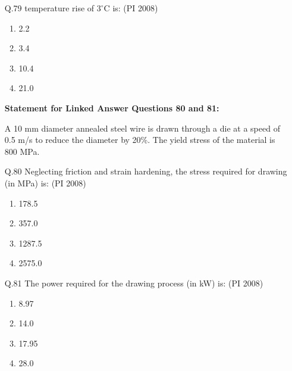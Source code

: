 \documentclass[journal,12pt,onecolumn]{IEEEtran}
\theoremstyle{remark}
\begin{document}
\begin{enumerate}
\textbf{Q.78} The torque (in N·m) applied by the brake on the rotating part is:\hfill{(PI 2008)} 
\begin{multicols}{4}
    \begin{enumerate}[label=(\Alph*)]
\item  215  
\item 315 
\item 630 
\item 1260

 \end{enumerate}
\end{multicols}
\vspace{1cm}


\item[\textnormal{Q.79}] temperature rise of $3^\circ$C is:
\hfill{(PI 2008)}
\begin{multicols}{4}
    \begin{enumerate}[label=(\Alph*)]
\item  2.2 
\item 3.4  
\item 10.4  
\item 21.0

 \end{enumerate}
\end{multicols}
\vspace{1cm}

\textbf{Statement for Linked Answer Questions 80 and 81:}

A 10 mm diameter annealed steel wire is drawn through a die at a speed of 0.5 m/s to reduce the diameter by 20\%.  
The yield stress of the material is 800 MPa.

\noindent
\item[\textnormal{Q.80}] Neglecting friction and strain hardening, the stress required for drawing (in MPa) is: \hfill{(PI 2008)}
\begin{multicols}{4}
    \begin{enumerate}[label=(\Alph*)]
\item  178.5 
\item 357.0 
\item 1287.5 
\item 2575.0

 \end{enumerate}
\end{multicols}
\vspace{1cm}

\noindent
\item[\textnormal{Q.81}] The power required for the drawing process (in kW) is: \hfill{(PI 2008)}
\begin{multicols}{4}
    \begin{enumerate}[label=(\Alph*)]
\item  8.97
\item 14.0 
\item 17.95 
\item 28.0
 \end{enumerate}
\end{multicols}
\vspace{1cm}


\end{enumerate}
\end{document}
